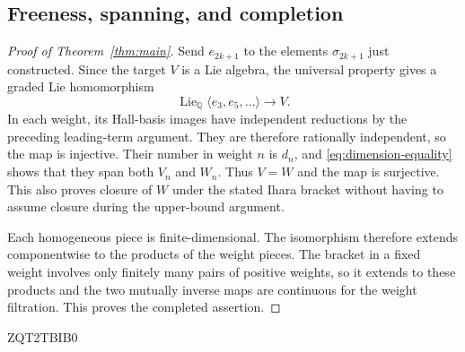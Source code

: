\documentclass[11pt]{article}
\theoremstyle{definition}
\theoremstyle{remark}
\numberwithin{equation}{section}
\begin{document}
\subsection{Freeness, spanning, and completion}
\begin{proof}[Proof of Theorem~\ref{thm:main}]
\label{thm:main-proof}
Send \(e_{2k+1}\) to the elements \(\sigma_{2k+1}\) just
constructed.  Since the target \(V\) is a Lie algebra, the
universal property gives a graded Lie homomorphism
\[
 \operatorname{Lie}_\mathbb Q\langle e_3,e_5,\ldots\rangle\longrightarrow V.
\]
In each weight, its Hall-basis images have independent
reductions by the preceding leading-term argument.  They are
therefore rationally independent, so the map is injective.
Their number in weight \(n\) is \(d_n\), and
\eqref{eq:dimension-equality} shows that they span both \(V_n\)
and \(W_n\).  Thus \(V=W\) and the map is surjective.
This also proves closure of \(W\) under the stated Ihara bracket
without having to assume closure during the upper-bound argument.

Each homogeneous piece is finite-dimensional.  The isomorphism
therefore extends componentwise to the products of the weight
pieces.  The bracket in a fixed weight involves only finitely
many pairs of positive weights, so it extends to these products
and the two mutually inverse maps are continuous for the weight
filtration.  This proves the completed assertion.
\end{proof}



ZQT2TBIB0
\end{document}
